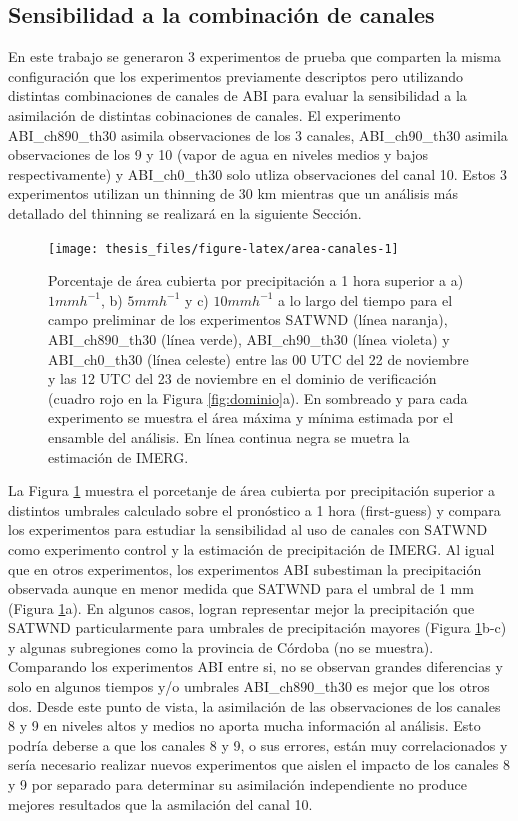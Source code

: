 \documentclass[12pt,oneside,a4paper]{reedthesis}
\begin{document}
\hypertarget{canales}{%
\subsection{Sensibilidad a la combinación de canales}\label{canales}}

En este trabajo se generaron 3 experimentos de prueba que comparten la misma configuración que los experimentos previamente descriptos pero utilizando distintas combinaciones de canales de ABI para evaluar la sensibilidad a la asimilación de distintas cobinaciones de canales. El experimento ABI\_ch890\_th30 asimila observaciones de los 3 canales, ABI\_ch90\_th30 asimila observaciones de los 9 y 10 (vapor de agua en niveles medios y bajos respectivamente) y ABI\_ch0\_th30 solo utliza observaciones del canal 10. Estos 3 experimentos utilizan un thinning de 30 km mientras que un análisis más detallado del thinning se realizará en la siguiente Sección.


\begin{figure}
\texttt{[image: thesis\_files/figure-latex/area-canales-1]} \caption{Porcentaje de área cubierta por precipitación a 1 hora superior a a) \(1 mmh^{-1}\), b) \(5 mmh^{-1}\) y c) \(10 mmh^{-1}\) a lo largo del tiempo para el campo preliminar de los experimentos SATWND (línea naranja), ABI\_ch890\_th30 (línea verde), ABI\_ch90\_th30 (línea violeta) y ABI\_ch0\_th30 (línea celeste) entre las 00 UTC del 22 de noviembre y las 12 UTC del 23 de noviembre en el dominio de verificación (cuadro rojo en la Figura \ref{fig:dominio}a). En sombreado y para cada experimento se muestra el área máxima y mínima estimada por el ensamble del análisis. En línea continua negra se muetra la estimación de IMERG.}\label{fig:area-canales}
\end{figure}
La Figura \ref{fig:area-canales} muestra el porcetanje de área cubierta por precipitación superior a distintos umbrales calculado sobre el pronóstico a 1 hora (first-guess) y compara los experimentos para estudiar la sensibilidad al uso de canales con SATWND como experimento control y la estimación de precipitación de IMERG. Al igual que en otros experimentos, los experimentos ABI subestiman la precipitación observada aunque en menor medida que SATWND para el umbral de 1 mm (Figura \ref{fig:area-canales}a). En algunos casos, logran representar mejor la precipitación que SATWND particularmente para umbrales de precipitación mayores (Figura \ref{fig:area-canales}b-c) y algunas subregiones como la provincia de Córdoba (no se muestra). Comparando los experimentos ABI entre si, no se observan grandes diferencias y solo en algunos tiempos y/o umbrales ABI\_ch890\_th30 es mejor que los otros dos. Desde este punto de vista, la asimilación de las observaciones de los canales 8 y 9 en niveles altos y medios no aporta mucha información al análisis. Esto podría deberse a que los canales 8 y 9, o sus errores, están muy correlacionados y sería necesario realizar nuevos experimentos que aislen el impacto de los canales 8 y 9 por separado para determinar su asimilación independiente no produce mejores resultados que la asmilación del canal 10.
\end{document}
